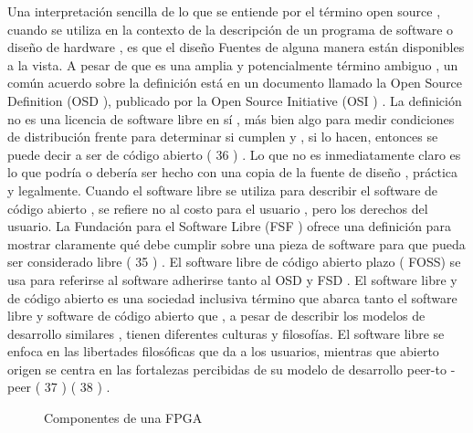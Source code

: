 Una interpretación sencilla de lo que se entiende por el término open source , cuando se utiliza en la
contexto de la descripción de un programa de software o diseño de hardware , es que el diseño
Fuentes de alguna manera están disponibles a la vista. A pesar de que es una amplia y potencialmente
término ambiguo , un común acuerdo sobre la definición está en un documento llamado
la Open Source Definition (OSD ), publicado por la Open Source Initiative (OSI ) .
La definición no es una licencia de software libre en sí , más bien algo para medir condiciones de distribución frente para determinar si cumplen y , si lo hacen, entonces se puede decir
a ser de código abierto ( 36 ) . Lo que no es inmediatamente claro es lo que podría o debería ser
hecho con una copia de la fuente de diseño , práctica y legalmente. Cuando el software libre
se utiliza para describir el software de código abierto , se refiere no al costo para el usuario ,
pero los derechos del usuario. La Fundación para el Software Libre (FSF ) ofrece una definición
para mostrar claramente qué debe cumplir sobre una pieza de software para que pueda ser considerado
libre ( 35 ) .
El software libre de código abierto plazo ( FOSS) se usa para referirse al software
adherirse tanto al OSD y FSD . El software libre y de código abierto es una sociedad inclusiva
término que abarca tanto el software libre y software de código abierto que , a pesar de
describir los modelos de desarrollo similares , tienen diferentes culturas y filosofías.
El software libre se enfoca en las libertades filosóficas que da a los usuarios, mientras que abierto
origen se centra en las fortalezas percibidas de su modelo de desarrollo peer-to -peer ( 37 ) ( 38 ) .





\begin{figure}[h!]
 \begin{center}
  \caption{Componentes de una FPGA}
  \label{fig:esquema}
 \end{center}
\end{figure}




